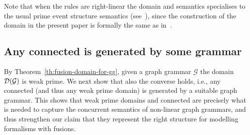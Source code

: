 






Note that when the rules are right-linear the domain and {\esabbr} semantics
specialises to the usual prime event structure semantics
(see~\cite{Handbook,Bal:PhD,Sch:RRSG}), since the construction of the
domain in the present paper is formally the same as
in~\cite{Handbook}.

\subsection{Any connected {\esabbr} is generated by some grammar}
\label{ss:es-graph}

By Theorem~\ref{th:fusion-domain-for-gg}, given a graph grammar
$\mathcal{G}$ the domain $\mathcal{D}({\mathcal{G}})$ is weak prime.
We next show that also the converse holds, i.e., any connected
{\esabbr} (and thus any weak prime domain) is generated by a suitable graph
grammar.
%
This shows that weak prime domains and connected {\esabbr} are
precisely what is needed to capture the concurrent semantics of
non-linear graph grammars, and thus strengthen our claim that they
represent the right structure for modelling formalisms with fusions.

